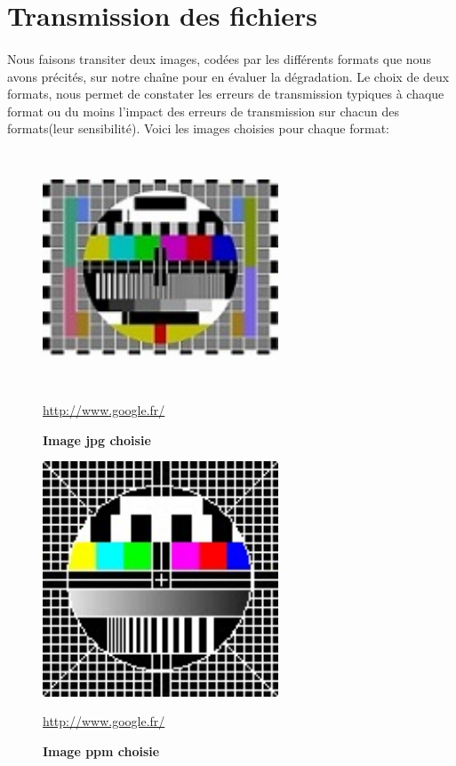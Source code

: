 \section{Transmission des fichiers}
\paragraph{}
Nous faisons transiter deux images, codées par les différents formats que nous avons précités, sur notre chaîne pour en évaluer la dégradation. Le choix de deux formats, nous permet de constater les erreurs de transmission typiques à chaque format ou du moins l'impact des erreurs de transmission sur chacun des formats(leur sensibilité). 
\clearpage
Voici les images choisies pour chaque format:

\begin{figure}[bth]%
\begin{center}
\includegraphics[height=70mm,width=70mm]{test_jpeg}%
\caption{\textbf{Image jpg choisie}}%
\url {http://www.google.fr/}
\label{test_jpeg}%
\end {center}
\end{figure}

\begin{figure}[bth]%
\begin{center}
\includegraphics[height=70mm,width=70mm]{test_bmp}%
\caption{\textbf{Image ppm choisie}}%
\url {http://www.google.fr/}
\label{bmp}%
\end {center}
\end{figure}


